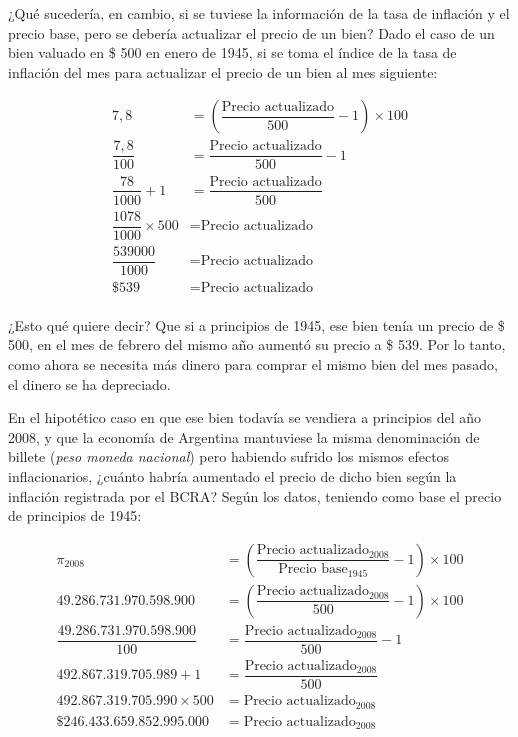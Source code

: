 \documentclass[12pt,a4paper,twoside]{book}
\begin{document}
¿Qué sucedería, en cambio, si se tuviese la información de la tasa de inflación y el precio base, pero se debería actualizar el precio de un bien? Dado el caso de un bien valuado en \$ 500 en enero de 1945, si se toma el índice de la tasa de inflación del mes para actualizar el precio de un bien al mes siguiente:

\begin{align*}
7,8 &= \left( \dfrac{\text{Precio actualizado}}{500} - 1 \right) \times 100 \\
\dfrac{7,8}{100} &= \dfrac{\text{Precio actualizado}}{500} - 1 \\
\dfrac{78}{1000} + 1 &= \dfrac{\text{Precio actualizado}}{500} \\
\dfrac{1078}{1000} \times 500 &= \text{Precio actualizado} \\
\dfrac{539000}{1000} &= \text{Precio actualizado} \\
\text{\$ } 539 &= \text{Precio actualizado} \\
\end{align*}

¿Esto qué quiere decir? Que si a principios de 1945, ese bien tenía un precio de \$ 500, en el mes de febrero del mismo año aumentó su precio a \$ 539. Por lo tanto, como ahora se necesita más dinero para comprar el mismo bien del mes pasado, el dinero se ha depreciado.

En el hipotético caso en que ese bien todavía se vendiera a principios del año 2008, y que la economía de Argentina mantuviese la misma denominación de billete (\textit{peso moneda nacional}) pero habiendo sufrido los mismos efectos inflacionarios, ¿cuánto habría aumentado el precio de dicho bien según la inflación registrada por el BCRA? Según los datos, teniendo como base el precio de principios de 1945:

\begin{align*}
\pi_{2008} &= \left( \dfrac{\text{Precio actualizado}_{2008}}{\text{Precio base}_{1945}} - 1 \right) \times 100 \\
49.286.731.970.598.900 &= \left( \dfrac{\text{Precio actualizado}_{2008}}{500} - 1 \right) \times 100 \\
\dfrac{49.286.731.970.598.900}{100} &= \dfrac{\text{Precio actualizado}_{2008}}{500} - 1 \\
492.867.319.705.989 + 1 &= \dfrac{\text{Precio actualizado}_{2008}}{500} \\
492.867.319.705.990 \times 500 &= \text{Precio actualizado}_{2008} \\
\text{\$ } 246.433.659.852.995.000 &= \text{Precio actualizado}_{2008} \\
\end{align*}
\end{document}
